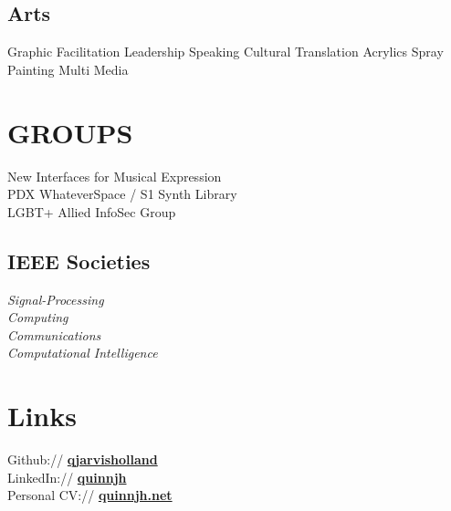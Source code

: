 \documentclass[]{quinnJarvisHollandLatex}
\begin{document}
\begin{minipage}[t]{0.33\textwidth}
\subsection{Arts}
Graphic Facilitation \textbullet{} Leadership \textbullet{} Speaking 
\textbullet{} Cultural Translation \textbullet{}Acrylics \textbullet{}Spray Painting \textbullet{}Multi Media\\
\sectionsep


\section{GROUPS}
New Interfaces for Musical Expression \\
PDX WhateverSpace / S1 Synth Library \\
LGBT+ Allied InfoSec Group \\

\subsection{IEEE Societies}
     \textit{   Signal-Processing}\\ 
     \textit{   Computing}\\ 
     \textit{   Communications}\\
     \textit{   Computational Intelligence}\\
\sectionsep

\section{Links}
Github:// \href{https://github.com/qjarvisholland}{\bf qjarvisholland} \\
LinkedIn://  \href{https://www.linkedin.com/in/quinnjh/}{\bf quinnjh} \\
Personal CV:// \href{https://quinnjh.net}{\bf quinnjh.net}
\sectionsep

\end{minipage}
\end{document}
